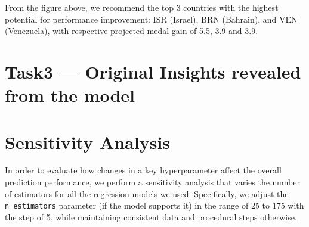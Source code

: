\documentclass{mcmthesis}
\begin{document}
From the figure above, we recommend the top 3 countries with the highest potential for performance improvement: ISR (Israel), BRN (Bahrain), and VEN (Venezuela), with respective projected medal gain of 5.5, 3.9 and 3.9.


\section{Task3 --- Original Insights revealed from the model}
\subsection{}


\subsection{}


\subsection{}


\subsection{}


\subsection{}








\section{Sensitivity Analysis}
In order to evaluate how changes in a key hyperparameter affect the overall prediction performance,
we perform a sensitivity analysis that varies the number of estimators for all the regression models we used.
Specifically, we adjust the \texttt{n\_estimators} parameter (if the model supports it) in the range of 25 to 175 with the step of 5, while maintaining consistent data and procedural steps otherwise.
\end{document}
